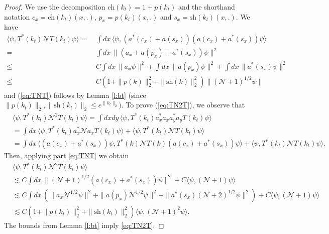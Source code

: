\documentclass[11pt,a4paper]{article}
\newcommand{\N}{\mathcal{N}}
\begin{document}

\begin{proof}
We use the decomposition $\text{ch} (k_t) = 1 + p(k_t)$ and the shorthand notation $c_x = \text{ch} (k_t) (x,.)$, $p_x = p(k_t) (x,.)$ and $s_x = \text{sh} (k_t) (x,.)$. We have
 \[\begin{split} 
  \langle \psi, T^* (k_t)  \N T (k_t) \psi \rangle = \; & \int dx \, \langle  \psi, (a^* (c_x) + a (s_x)) (a (c_x) + a^* (s_x)) \psi \rangle \\ = \; &\int dx \, \| (a_x + a(p_x) + a^*(s_x)) \psi
  \|^2 \\  \leq \; &C  \int dx \, \| a_x \psi \|^2
    + \int dx \, \| a(p_x) \psi \|^2 + \int dx \, \| a^*(s_x) \psi \|^2 \\
    \leq \; &C ( 1 + \| p (k) \|_2^2 + \| \text{sh} (k) \|_2^2 ) \| (\N + 1)^{1/2}  \psi \| 
      \end{split}\]
and (\ref{eq:TNT}) follows by Lemma \ref{l:bt} (since $\| p (k_t) \|_2, \| \text{sh} (k_t) \|_2 \leq e^{\| k_t \|_2})$. To prove (\ref{eq:TN2T}), we observe that 
\begin{align*}
 & \langle \psi, T^* (k_t) \N^2 T (k_t) \psi \rangle = \int dxdy \, \langle \psi, T^* (k_t)  a_x^* a_x a_y^* a_y T (k_t) \psi \rangle \\
    & = \int dx \, \langle \psi, T^* (k_t)  a_x^* \N a_x T (k_t) \psi \rangle + \langle
    \psi, T^* (k_t)  \N T (k_t) \psi \rangle \\
    & = \int dx \, \langle (a(c_x) + a^*(s_x)) \psi, T^* (k)  \N T (k) (a (c_x)  + a^*(s_x)) \psi \rangle + \langle \psi, T^* (k_t) \N T (k_t) \psi \rangle.
  \end{align*}
  Then, applying part \eqref{eq:TNT}  we obtain
  \begin{align*}
    & \langle \psi, T^* (k_t) \N^2 T (k_t) \psi \rangle \\
    & \apprle C \int dx \, \| (\N+1)^{1/2} (a (c_x) +
    a^*(s_x)) \psi \|^2 + C \langle \psi, (\N+1) \psi \rangle \\
    & \apprle C \int dx \, (\| a_x \N^{1/2} \psi \|^2 + \| a(p_x)
    \N^{1/2} \psi \|^2 + \| a^*(s_x) (\N+2)^{1/2} \psi \|^2 ) + C \langle
    \psi, (\N+1) \psi \rangle \\
    & \apprle C(1 + \| p (k_t) \|_{2}^2 + \| \text{sh} (k_t)  \|_{2}^2) \langle \psi, (\N+1)^2
    \psi \rangle.
  \end{align*}
The bounds from Lemma \ref{l:bt} imply \eqref{eq:TN2T}.
\end{proof}
\end{document}
